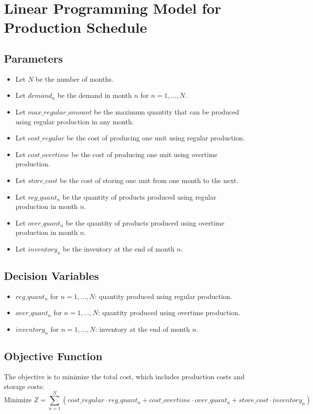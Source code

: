 \documentclass{article}
\begin{document}
\section*{Linear Programming Model for Production Schedule}

\subsection*{Parameters}
\begin{itemize}
    \item Let \( N \) be the number of months.
    \item Let \( demand_n \) be the demand in month \( n \) for \( n = 1, \ldots, N \).
    \item Let \( max\_regular\_amount \) be the maximum quantity that can be produced using regular production in any month.
    \item Let \( cost\_regular \) be the cost of producing one unit using regular production.
    \item Let \( cost\_overtime \) be the cost of producing one unit using overtime production.
    \item Let \( store\_cost \) be the cost of storing one unit from one month to the next.
    \item Let \( reg\_quant_n \) be the quantity of products produced using regular production in month \( n \).
    \item Let \( over\_quant_n \) be the quantity of products produced using overtime production in month \( n \).
    \item Let \( inventory_n \) be the inventory at the end of month \( n \).
\end{itemize}

\subsection*{Decision Variables}
\begin{itemize}
    \item \( reg\_quant_n \) for \( n = 1, \ldots, N \): quantity produced using regular production.
    \item \( over\_quant_n \) for \( n = 1, \ldots, N \): quantity produced using overtime production.
    \item \( inventory_n \) for \( n = 1, \ldots, N \): inventory at the end of month \( n \).
\end{itemize}

\subsection*{Objective Function}
The objective is to minimize the total cost, which includes production costs and storage costs:
\[
\text{Minimize } Z = \sum_{n=1}^{N} \left( cost\_regular \cdot reg\_quant_n + cost\_overtime \cdot over\_quant_n + store\_cost \cdot inventory_n \right)
\]
\end{document}
